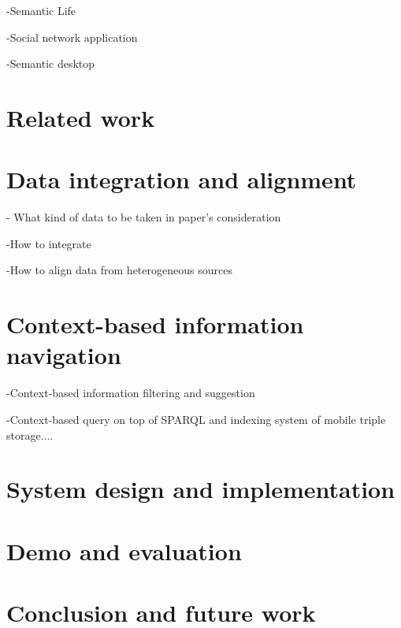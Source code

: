 \documentclass[runningheads,a4paper]{llncs}
\begin{document}
-Semantic Life

-Social network application

-Semantic desktop

\section{Related work}

\section{Data integration and alignment}

- What kind of data to be taken in paper's consideration

-How to integrate

-How to align data from heterogeneous  sources

\section{Context-based information navigation}

-Context-based information filtering and suggestion

-Context-based query on top of SPARQL and indexing system of mobile triple storage....

\section{System design and implementation}

\section{Demo and evaluation}

\section{Conclusion and future work}

%


\end{document}
